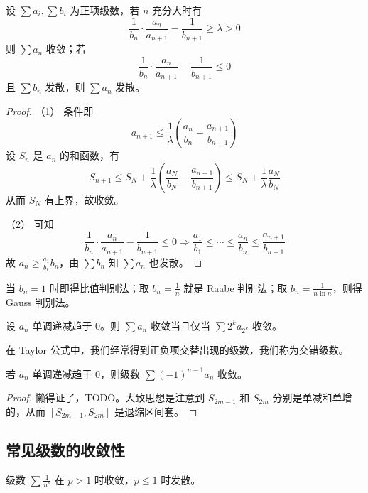\begin{theorem}[Kummer]
	设 $\sum a_i, \sum b_i$ 为正项级数，若 $n$ 充分大时有
	\[ \frac{1}{b_n} \cdot \frac{a_n}{a_{n+1}} - \frac{1}{b_{n+1}} \geqslant \lambda > 0 \]
	则 $\sum a_n$ 收敛；若
	\[ \frac{1}{b_n} \cdot \frac{a_n}{a_{n+1}} - \frac{1}{b_{n+1}} \leqslant 0 \]
	且 $\sum b_n$ 发散，则 $\sum a_n$ 发散。
\end{theorem}

\begin{proof}
	（1） 条件即
	\[ a_{n+1} \leqslant \frac{1}{\lambda} \left( \frac{a_n}{b_n} - \frac{a_{n+1}}{b_{n+1}} \right) \]
	设 $S_n$ 是 $a_n$ 的和函数，有
	\[ S_{n+1} \leqslant S_N +\frac{1}{\lambda} \left( \frac{a_N}{b_N} - \frac{a_{n+1}}{b_{n+1}} \right) \leqslant S_N + \frac{1}{\lambda} \frac{a_N}{b_N} \]
	从而 $S_N$ 有上界，故收敛。
	
	（2） 可知
	\[ \frac{1}{b_n} \cdot \frac{a_n}{a_{n+1}} - \frac{1}{b_{n+1}} \leqslant 0 \Longrightarrow \frac{a_1}{b_1} \leqslant \cdots \leqslant \frac{a_n}{b_n} \leqslant \frac{a_{n+1}}{b_{n+1}} \]
	故 $a_n \geqslant \frac{a_1}{b_1} b_n$，由 $\sum b_n$ 知 $\sum a_n$ 也发散。
\end{proof}

当 $b_n = 1$ 时即得比值判别法；取 $b_n = \frac{1}{n}$ 就是 Raabe 判别法；取 $b_n = \frac{1}{n \ln n}$，则得 Gauss 判别法。

\begin{theorem}
	设 $a_n$ 单调递减趋于 $0$。则 $\sum a_n$ 收敛当且仅当 $\sum 2^k a_{2^k}$ 收敛。
\end{theorem}

在 Taylor 公式中，我们经常得到正负项交替出现的级数，我们称为交错级数。

\begin{theorem}
	若 $a_n$ 单调递减趋于 $0$，则级数 $\sum (-1)^{n-1} a_n$ 收敛。
\end{theorem}

\begin{proof}
	懒得证了，TODO。大致思想是注意到 $S_{2m-1}$ 和 $S_{2m}$ 分别是单减和单增的，从而 $[S_{2m-1}, S_{2m}]$ 是退缩区间套。
\end{proof}

\subsection{常见级数的收敛性}

\begin{theorem}
	级数 $\sum \frac{1}{n^p}$ 在 $p > 1$ 时收敛，$p \leqslant 1$ 时发散。
\end{theorem}

